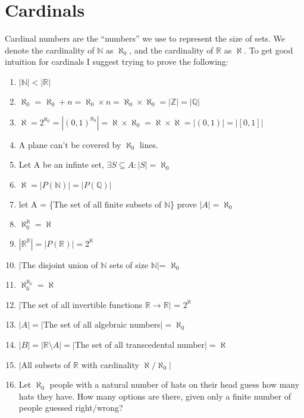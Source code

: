 \documentclass{article}
\newcommand{\N}{\mathbb{N}}
\newcommand{\Z}{\mathbb{Z}}
\newcommand{\Q}{\mathbb{Q}}
\newcommand{\R}{\mathbb{R}}
\theoremstyle{plain}
\begin{document}
\section{Cardinals}
Cardinal numbers are the ``numbers'' we use to represent the size of 
sets. We denote the cardinality of $\N$ as $\aleph_0$, and the cardinality
of $\R$ as $\aleph$. To get good intuition for cardinals I suggest trying 
to prove the following:
\begin{enumerate}
    \item $|\N| < |\R|$
    \item $\aleph_{0}$ = 
    $\aleph_{0} + n = \aleph_0 \times n=\aleph_0\times\aleph_0=|\Z|=|\Q|$
    \item $\aleph = 2^{\aleph_0} = |(0,1)^{\aleph_0}| = \aleph\times\aleph_0 
    = \aleph\times\aleph = |(0,1)| = |[0,1]|$
    \item A plane can't be covered by $\aleph_0$ lines.
    \item Let A be an infinte set, $\exists S\subseteq A : |S|=\aleph_0$
    \item $\aleph = |P(\N)|= |P(\Q)|$
    \item let A = \{The set of all finite subsets of $\N$\} prove 
    $|A|=\aleph_0$
    \item $\aleph^\aleph_0=\aleph$
    \item $|\R^\R|=|P(\R)|=2^\aleph$
    \item $|$The disjoint union of $\N$ sets of size $\N|$= $\aleph_0$
    \item $\aleph_0^{\aleph_0} =\aleph$
    \item $|$The set of all invertible functions $\R\rightarrow\R|$ 
    = $2^\aleph$
    \item $|A|=|$The set of all algebraic numbers$|=\aleph_0$
    \item $|B|=|\R\setminus A|=|$The set of all transcedental number$|=\aleph$
    \item $|$All subsets of $\R$ with cardinality $\aleph/\aleph_0|$
    \item Let $\aleph_0$ people with a natural number of hats on their head 
    guess how many hats they have. How many options are there, given only 
    a finite number of people guessed right/wrong?
    
\end{enumerate}


\newpage
\end{document}
